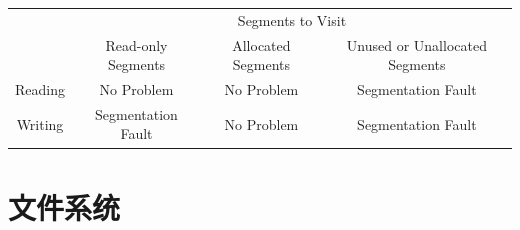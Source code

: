 \documentclass[]{report}
\begin{document}
		\begin{table}
			\centering
			\begin{tabular}{cccc}
				\toprule
				&\multicolumn{3}{c}{Segments to Visit}\\
				\cmidrule{2-4}
				&Read-only Segments&Allocated Segments&Unused or Unallocated Segments\\
				\midrule
				Reading&No Problem&No Problem&Segmentation Fault\\
				Writing&Segmentation Fault&No Problem&Segmentation Fault\\
				\bottomrule
			\end{tabular}
		\end{table}
	\section{文件系统}
\end{document}
